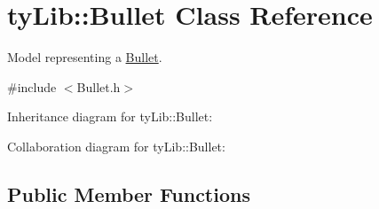 \hypertarget{classty_lib_1_1_bullet}{}\section{ty\+Lib\+:\+:Bullet Class Reference}
\label{classty_lib_1_1_bullet}


Model representing a \hyperlink{classty_lib_1_1_bullet}{Bullet}.  




{\ttfamily \#include $<$Bullet.\+h$>$}



Inheritance diagram for ty\+Lib\+:\+:Bullet\+:


Collaboration diagram for ty\+Lib\+:\+:Bullet\+:
\subsection*{Public Member Functions}
